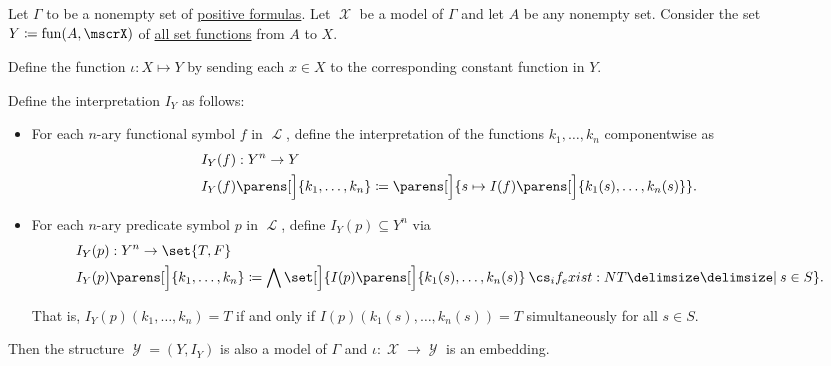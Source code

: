 \begin{proposition}\label{thm:functions_over_model_form_model}
  Let \( \Gamma \) to be a nonempty set of \hyperref[def:positive_formula]{positive formulas}. Let \( \mscrX \) be a model of \( \Gamma \) and let \( A \) be any nonempty set. Consider the set \( Y \coloneqq \fun(A, \mscrX) \) of \hyperref[def:function]{all set functions} from \( A \) to \( X \).

  Define the function \( \iota: X \mapsto Y \) by sending each \( x \in X \) to the corresponding constant function in \( Y \).

  Define the interpretation \( I_Y \) as follows:
  \begin{itemize}
    \item For each \( n \)-ary functional symbol \( f \) in \( \mscrL \), define the interpretation of the functions \( k_1, \ldots, k_n \) componentwise as
    \begin{equation*}
      \begin{aligned}
        &I_Y(f): Y^n \to Y \\
        &I_Y(f) \parens[\Big]{ k_1, \ldots, k_n } \coloneqq \parens[\Big]{ s \mapsto I(f) \parens[\Big]{ k_1(s), \ldots, k_n(s) } }.
      \end{aligned}
    \end{equation*}

    \item For each \( n \)-ary predicate symbol \( p \) in \( \mscrL \), define \( I_Y(p) \subseteq Y^n \) via
    \begin{equation*}
      \begin{aligned}
        &I_Y(p): Y^n \to \set{ T, F } \\
        &I_Y(p) \parens[\Big]{ k_1, \ldots, k_n } \coloneqq \bigwedge \set[\Big]{ I(p) \parens[\Big]{ k_1(s), \ldots, k_n(s) } \given* s \in S }.
      \end{aligned}
    \end{equation*}

    That is, \( I_Y(p) (k_1, \ldots, k_n) = T \) if and only if \( I(p) (k_1(s), \ldots, k_n(s)) = T \) simultaneously for all \( s \in S \).
  \end{itemize}

  Then the structure \( \mscrY = (Y, I_Y) \) is also a model of \( \Gamma \) and \( \iota: \mscrX \to \mscrY \) is an embedding.
\end{proposition}
